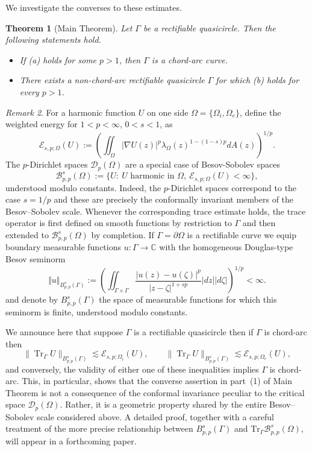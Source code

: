 \documentclass[11pt]{article}
\numberwithin{equation}{section}
\newtheorem{theorem}{Theorem}
\theoremstyle{remark}
\newtheorem{remark}[theorem]{Remark}
\begin{document}
We investigate the converses to these estimates.
\begin{theorem}[Main Theorem] \label{rec} 
Let $\Gamma$ be a rectifiable quasicircle.  Then the following statements
hold.
\begin{itemize}
    \item[{\rm(1)}] If \rm{(a)} holds for some $p>1$, then $\Gamma$ is a chord-arc curve.
    \item[{\rm(2)}] There exists a non-chord-arc rectifiable quasicircle $\Gamma$ for which \rm{(b)} holds for every $p>1$.
\end{itemize}
\end{theorem}
\begin{remark}
    For a harmonic function $U$ on one side  $\Omega = \{\Omega_i, \Omega_e\}$,  define the weighted energy for $1<p<\infty$, $0<s<1$, as
$$
\mathcal E_{s,p;\Omega}(U) :=  \left(\iint_\Omega |\nabla U(z)|^p\lambda_\Omega(z)^{1-(1-s)p}dA(z)\right)^{1/p}.
$$
The $p$-Dirichlet spaces $\mathcal D_p(\Omega)$ are a special case of  Besov-Sobolev spaces
\[  
\mathcal B_{p,p}^s(\Omega)  
:=\{U:\ U\text{ harmonic in }\Omega,             
\ \mathcal E_{s,p;\Omega}(U)<\infty\},
\]
understood modulo constants.
Indeed, the $p$-Dirichlet spaces correspond to the case $s=1/p$ and these are precisely the conformally invariant members of the
Besov--Sobolev scale.  Whenever
the corresponding trace estimate holds, the trace operator is first defined
on smooth functions by restriction to $\Gamma$ and then extended to
$\mathcal B_{p,p}^s(\Omega)$ by completion. If $\Gamma=\partial\Omega$ is a rectifiable curve we equip boundary measurable functions $u:\Gamma\to\mathbb C$ with the
homogeneous Douglas-type Besov seminorm 
$$
\Vert u\Vert_{B_{p,p}^s(\Gamma)} := \left(\iint_{\Gamma\times\Gamma}\frac{|u(z)-u(\zeta)|^p}{|z-\zeta|^{1+sp}}|dz||d\zeta|\right)^{1/p}<\infty.
$$
and denote by $B_{p,p}^s(\Gamma)$ the space of measurable functions for which
this seminorm is finite, understood modulo constants.

We announce here that 
suppose $\Gamma$ is a rectifiable quasicircle then if $\Gamma$ is chord-arc then 
\begin{equation}    
\|\operatorname{Tr}_\Gamma U\|_{B^s_{p,p}(\Gamma)} \lesssim \mathcal E_{s,p;\Omega_i}(U), \qquad \|\operatorname{Tr}_\Gamma U\|_{B^s_{p,p}(\Gamma)} \lesssim \mathcal E_{s,p;\Omega_e}(U),
\end{equation}
and conversely, the validity of either one of these inequalities implies $\Gamma$ is chord-arc. This, in particular, shows that the converse assertion in part~{\rm(1)} of Main Theorem
is not a consequence of the conformal invariance peculiar to the critical
space $\mathcal D_p(\Omega)$. Rather, it is a geometric property shared by
the entire Besov--Sobolev scale considered above. A detailed proof,
together with a careful treatment of the more precise relationship between $B_{p,p}^s(\Gamma)$ and $\text{Tr}_\Gamma\mathcal B_{p,p}^s(\Omega)$, will appear in a
forthcoming paper.
\end{remark}
\end{document}
